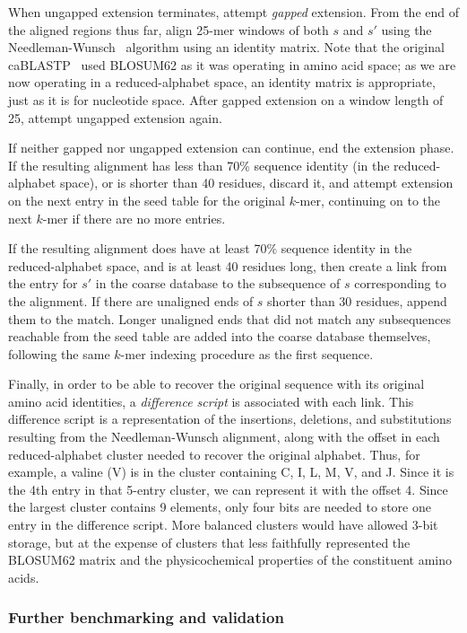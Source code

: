 \documentclass[review,preprint,12pt]{elsarticle}
\renewcommand{\cite}{\citep} %
\theoremstyle{definition}
\theoremstyle{remark}
\numberwithin{equation}{section}
\begin{document}
When ungapped extension terminates, attempt \textit{gapped} extension.
From the end of the aligned regions thus far, align 25-mer windows of both
$s$ and $s'$ using the Needleman-Wunsch~\cite{needleman1970general} algorithm 
using an identity matrix.
Note that the original caBLASTP~\cite{daniels2013compressive} used BLOSUM62 as 
it was
operating in amino acid space; as we are now operating in a reduced-alphabet
space, an identity matrix is appropriate, just as it is for nucleotide space.
After gapped extension on a window length of 25, attempt ungapped extension
again.

If neither gapped nor ungapped extension can continue, end the extension phase.
If the resulting alignment has less than 70\% sequence identity (in the 
reduced-alphabet space), or is shorter than 40 residues, discard it, and 
attempt extension on the next entry in the seed table for the original $k$-mer,
continuing on to the next $k$-mer if there are no more entries.

If the resulting alignment does have at least 70\% sequence identity in the
reduced-alphabet space, and is at least 40 residues long, then create a link
from the entry for $s'$ in the coarse database to the subsequence of $s$
corresponding to the alignment.
If there are unaligned ends of $s$ shorter than 30 residues, append them to the
match.
Longer unaligned ends that did not match any subsequences reachable from the
seed table are added into the coarse database themselves, following the same
$k$-mer indexing procedure as the first sequence.

Finally, in order to be able to recover the original sequence with its original
amino acid identities, a \textit{difference script} is associated with each
link.
This difference script is a representation of the insertions, deletions, and
substitutions resulting from the Needleman-Wunsch alignment, along with the
offset in each reduced-alphabet cluster needed to recover the original alphabet.
Thus, for example, a valine (V) is in the cluster containing C, I, L, M, V, and 
J.
Since it is the 4th entry in that 5-entry cluster, we can represent it with
the offset 4.
Since the largest cluster contains 9 elements, only four bits are needed to
store one entry in the difference script.
More balanced clusters would have allowed 3-bit storage, but at the expense of
clusters that less faithfully represented the BLOSUM62 matrix and the
physicochemical properties of the constituent amino acids.

\subsubsection{Further benchmarking and validation}
\end{document}
